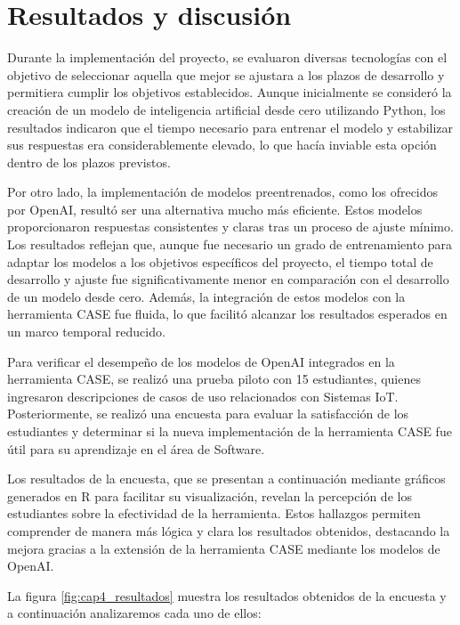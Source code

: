 \chapter{Resultados y discusión}\label{chapter:resultados}

Durante la implementación del proyecto, se evaluaron diversas tecnologías con el objetivo de seleccionar aquella que mejor se ajustara a los plazos de desarrollo y permitiera cumplir los objetivos establecidos. Aunque inicialmente se consideró la creación de un modelo de inteligencia artificial desde cero utilizando Python, los resultados indicaron que el tiempo necesario para entrenar el modelo y estabilizar sus respuestas era considerablemente elevado, lo que hacía inviable esta opción dentro de los plazos previstos.

Por otro lado, la implementación de modelos preentrenados, como los ofrecidos por OpenAI, resultó ser una alternativa mucho más eficiente. Estos modelos proporcionaron respuestas consistentes y claras tras un proceso de ajuste mínimo. Los resultados reflejan que, aunque fue necesario un grado de entrenamiento para adaptar los modelos a los objetivos específicos del proyecto, el tiempo total de desarrollo y ajuste fue significativamente menor en comparación con el desarrollo de un modelo desde cero. Además, la integración de estos modelos con la herramienta CASE fue fluida, lo que facilitó alcanzar los resultados esperados en un marco temporal reducido.

Para verificar el desempeño de los modelos de OpenAI integrados en la herramienta CASE, se realizó una prueba piloto con 15 estudiantes, quienes ingresaron descripciones de casos de uso relacionados con Sistemas IoT. Posteriormente, se realizó una encuesta para evaluar la satisfacción de los estudiantes y determinar si la nueva implementación de la herramienta CASE fue útil para su aprendizaje en el área de Software.

Los resultados de la encuesta, que se presentan a continuación mediante gráficos generados en R para facilitar su visualización, revelan la percepción de los estudiantes sobre la efectividad de la herramienta. Estos hallazgos permiten comprender de manera más lógica y clara los resultados obtenidos, destacando la mejora gracias a la extensión de la herramienta CASE mediante los modelos de OpenAI.

La figura \ref{fig:cap4_resultados} muestra los resultados obtenidos de la encuesta y a continuación analizaremos cada uno de ellos:

